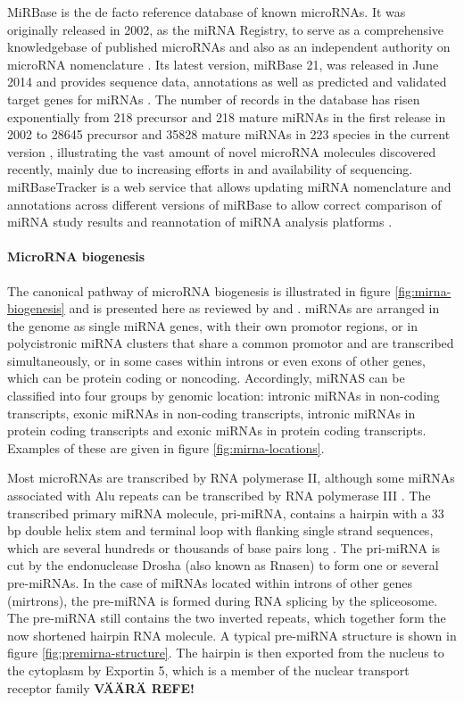 MiRBase is the de facto reference database of known microRNAs. It was
originally released in 2002, as the miRNA Registry, to serve as a
comprehensive knowledgebase of published microRNAs and also as an independent
authority on microRNA nomenclature \citep{Griffiths2004}. Its latest version,
miRBase 21, was released in June 2014 \citep{MiRBaseWeb} and provides sequence
data, annotations as well as predicted and validated target genes for miRNAs
\citep{Kozomara2014}. The number of records in the database has risen
exponentially from 218 precursor and 218 mature miRNAs in the first release in
2002 to 28645 precursor and 35828 mature miRNAs in 223 species in the current
version \citep{VanPeer2014,MiRBaseWeb}, illustrating the vast amount of novel
microRNA molecules discovered recently, mainly due to increasing efforts in
and availability of sequencing. miRBaseTracker is a web service that allows
updating miRNA nomenclature and annotations across different versions of
miRBase to allow correct comparison of miRNA study results and reannotation of
miRNA analysis platforms \citep{VanPeer2014}.





\paragraph{MicroRNA biogenesis}\label{microrna-biogenesis}

The canonical pathway of microRNA biogenesis is illustrated in figure
\ref{fig:mirna-biogenesis} and is presented here as reviewed by  
\citet{Bartel2004} and \citet{Denzler2015}. miRNAs are arranged in the genome as
single miRNA genes, with their own promotor regions, or in polycistronic miRNA
clusters that share a common promotor and are transcribed simultaneously, or
in some cases within introns or even exons of other genes, which can be
protein coding or noncoding. Accordingly, miRNAS can be classified into four
groups by genomic location: intronic miRNAs in non-coding transcripts, exonic
miRNAs in non-coding transcripts, intronic miRNAs in protein coding
transcripts and exonic miRNAs in protein coding transcripts. Examples of these
are given in figure \ref{fig:mirna-locations}.

Most microRNAs are transcribed by RNA polymerase II, although some miRNAs
associated with Alu repeats can be transcribed by RNA polymerase III
\citep{Borchert2006}. The transcribed primary miRNA molecule, pri-miRNA, contains a
hairpin with a 33 bp double helix stem and terminal loop with flanking single
strand sequences, which are several hundreds or thousands of base pairs long
\citep{Kim2005}. The pri-miRNA is cut by the endonuclease Drosha (also known as
Rnasen) to form one or several pre-miRNAs. In the case of miRNAs located
within introns of other genes (mirtrons), the pre-miRNA is formed during RNA
splicing by the spliceosome. The pre-miRNA still contains the two inverted
repeats, which together form the now shortened hairpin RNA molecule. A typical
pre-miRNA structure is shown in figure \ref{fig:premirna-structure}. The
hairpin is then exported from the nucleus to the cytoplasm by Exportin 5,
which is a member of the nuclear transport receptor family \citep{T8??} \textbf{VÄÄRÄ REFE!}

